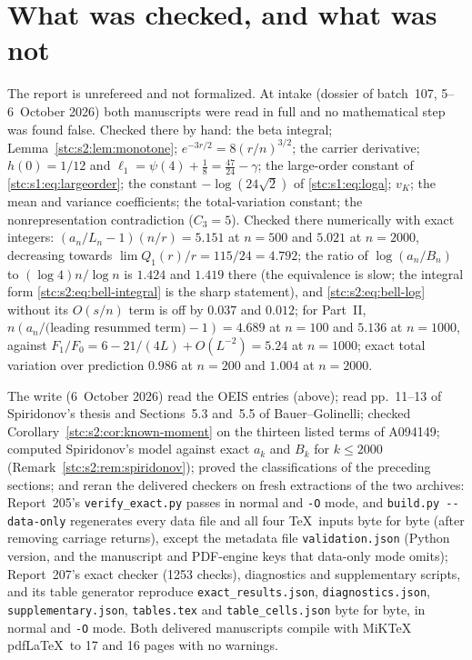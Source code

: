 \documentclass[11pt,letterpaper]{article}
\numberwithin{equation}{section}
\theoremstyle{remark}\newtheorem{remark}[theorem]{Remark}
\newcommand{\file}[1]{\nolinkurl{#1}}
\begin{document}
\section*{What was checked, and what was not}\label{stc:sec:trust}
The report is unrefereed and not formalized. At intake (dossier of batch~107, 5--6~October 2026) both manuscripts were read in full and no mathematical step was found false. Checked there by hand: the beta integral; Lemma~\ref{stc:s2:lem:monotone}; $e^{-3r/2}=8(r/n)^{3/2}$; the carrier derivative; $h(0)=1/12$ and $\ell_1=\psi(4)+\frac18=\frac{47}{24}-\gamma$; the large-order constant of \eqref{stc:s1:eq:largeorder}; the constant $-\log(24\sqrt2)$ of \eqref{stc:s1:eq:loga}; $v_K$; the mean and variance coefficients; the total-variation constant; the nonrepresentation contradiction ($C_3=5$). Checked there numerically with exact integers: $(a_n/L_n-1)(n/r)=5.151$ at $n=500$ and $5.021$ at $n=2000$, decreasing towards $\lim Q_1(r)/r=115/24=4.792$; the ratio of $\log(a_n/B_n)$ to $(\log4)n/\log n$ is $1.424$ and $1.419$ there (the equivalence is slow; the integral form \eqref{stc:s2:eq:bell-integral} is the sharp statement), and \eqref{stc:s2:eq:bell-log} without its $O(s/n)$ term is off by $0.037$ and $0.012$; for Part~II, $n(a_n/\text{(leading resummed term)}-1)=4.689$ at $n=100$ and $5.136$ at $n=1000$, against $F_1/F_0=6-21/(4L)+O(L^{-2})=5.24$ at $n=1000$; exact total variation over prediction $0.986$ at $n=200$ and $1.004$ at $n=2000$.

The write (6~October 2026) read the OEIS entries (above); read pp.~11--13 of Spiridonov's thesis and Sections~5.3 and~5.5 of Bauer--Golinelli; checked Corollary~\ref{stc:s2:cor:known-moment} on the thirteen listed terms of A094149; computed Spiridonov's model against exact $a_k$ and $B_k$ for $k\le2000$ (Remark~\ref{stc:s2:rem:spiridonov}); proved the classifications of the preceding sections; and reran the delivered checkers on fresh extractions of the two archives: Report~205's \file{verify_exact.py} passes in normal and \texttt{-O} mode, and \texttt{build.py -{}-data-only} regenerates every data file and all four \TeX\ inputs byte for byte (after removing carriage returns), except the metadata file \file{validation.json} (Python version, and the manuscript and PDF-engine keys that data-only mode omits); Report~207's exact checker (1253 checks), diagnostics and supplementary scripts, and its table generator reproduce \file{exact_results.json}, \file{diagnostics.json}, \file{supplementary.json}, \file{tables.tex} and \file{table_cells.json} byte for byte, in normal and \texttt{-O} mode. Both delivered manuscripts compile with MiKTeX pdf\LaTeX\ to 17 and 16 pages with no warnings.
\end{document}
